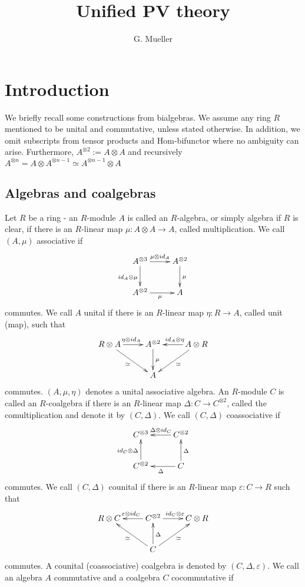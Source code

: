 \documentclass[10pt,a4paper]{article}
\author{G. Mueller}
\title{Unified PV theory}
\begin{document}
\section{Introduction}
We briefly recall some constructions from bialgebras. We assume any ring $R$ mentioned to be unital and commutative, unless stated otherwise. In addition, we omit subscripts from tensor products and $\mathrm{Hom}$-bifunctor where no ambiguity can arise. Furthermore, $A^{\otimes 2} := A \otimes A$ and recursively $A^{\otimes n} = A \otimes A^{\otimes n - 1} \simeq A^{\otimes n - 1} \otimes A$
\subsection{Algebras and coalgebras}
Let $R$ be a ring - an $R$-module $A$ is called an $R$-algebra, or simply algebra if $R$ is clear, if there is an $R$-linear map $\mu : A \otimes A \longrightarrow A$, called multiplication. We call $(A, \mu)$ associative if
$$\xymatrix{
A^{\otimes 3} \ar[r]^{\mu \otimes id_A}\ar[d]_{id_A \otimes \mu} & A^{\otimes 2}\ar[d]^\mu\\
A^{\otimes 2} \ar[r]_{\mu} & A\\
}$$
commutes. We call $A$ unital if there is an $R$-linear map $\eta : R \longrightarrow A$, called unit (map), such that
$$\xymatrix{
R \otimes A \ar[r]^{\eta \otimes id_A}\ar[rd]_{\simeq} & A^{\otimes2} \ar[d]^\mu & A \otimes R \ar[l]_{id_A \otimes \eta} \ar[ld]^{\simeq}\\
&A&\\
}$$
commutes. $(A, \mu, \eta)$ denotes a unital associative algebra. An $R$-module $C$ is called an $R$-coalgebra if there is an $R$-linear map $\Delta : C \longrightarrow C^{\otimes2}$, called the comultiplication and denote it by $(C, \Delta)$. We call $(C, \Delta)$ coassociative if
$$\xymatrix{
C^{\otimes 3} & C^{\otimes 2}\ar[l]_{\Delta \otimes id_C}\\
C^{\otimes 2} \ar[u]^{id_C \otimes \Delta} & C\ar[l]^{\Delta}\ar[u]_{\Delta}\\
}$$
commutes. We call $(C, \Delta)$ counital if there is an $R$-linear map $\varepsilon : C \longrightarrow R$ such that
$$\xymatrix{
R \otimes C & \ar[l]_{\varepsilon \otimes id_C} C^{\otimes2} \ar[r]^{id_C \otimes \varepsilon}& C \otimes R\\
& C \ar[u]_\Delta \ar[ul]^{\simeq} \ar[ur]_{\simeq}&\\
}$$
commutes. A counital (coassociative) coalgebra is denoted by $(C, \Delta, \varepsilon)$. We call an algebra $A$ commutative and a coalgebra $C$ cocommutative if
\end{document}
